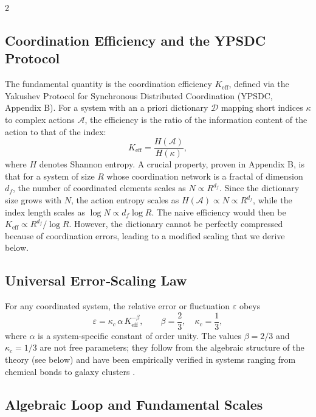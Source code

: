 \documentclass[12pt,a4paper]{article}
\newcommand{\kappac}{\kappa_c}
\newcommand{\Keff}{K_{\mathrm{eff}}}
\newcommand{\betaf}{\beta}
\begin{document}
\begin{multicols}{2}
		\subsection{Coordination Efficiency and the YPSDC Protocol}
		
		The fundamental quantity is the coordination efficiency \(K_{\mathrm{eff}}\), defined via the Yakushev Protocol for Synchronous Distributed Coordination (YPSDC, Appendix B). For a system with an a priori dictionary \(\mathcal{D}\) mapping short indices \(\kappa\) to complex actions \(\mathcal{A}\), the efficiency is the ratio of the information content of the action to that of the index:
		\begin{equation}
			\Keff = \frac{H(\mathcal{A})}{H(\kappa)},
			\label{eq:keff-def}
		\end{equation}
		where \(H\) denotes Shannon entropy. A crucial property, proven in Appendix B, is that for a system of size \(R\) whose coordination network is a fractal of dimension \(d_f\), the number of coordinated elements scales as \(N \propto R^{d_f}\). Since the dictionary size grows with \(N\), the action entropy scales as \(H(\mathcal{A}) \propto N \propto R^{d_f}\), while the index length scales as \(\log N \propto d_f \log R\). The naive efficiency would then be \(\Keff \propto R^{d_f} / \log R\). However, the dictionary cannot be perfectly compressed because of coordination errors, leading to a modified scaling that we derive below.
		
		\subsection{Universal Error‑Scaling Law}
		
		For any coordinated system, the relative error or fluctuation \(\varepsilon\) obeys
		\begin{equation}
			\varepsilon = \kappac \, \alpha \, \Keff^{-\betaf}, \qquad \betaf = \frac{2}{3}, \quad \kappac = \frac{1}{3},
			\label{eq:universal}
		\end{equation}
		where \(\alpha\) is a system‑specific constant of order unity. The values \(\betaf = 2/3\) and \(\kappac = 1/3\) are not free parameters; they follow from the algebraic structure of the theory (see below) and have been empirically verified in systems ranging from chemical bonds to galaxy clusters \cite{AppendixL}.
		
		\subsection{Algebraic Loop and Fundamental Scales}
		

\end{multicols}
\end{document}
